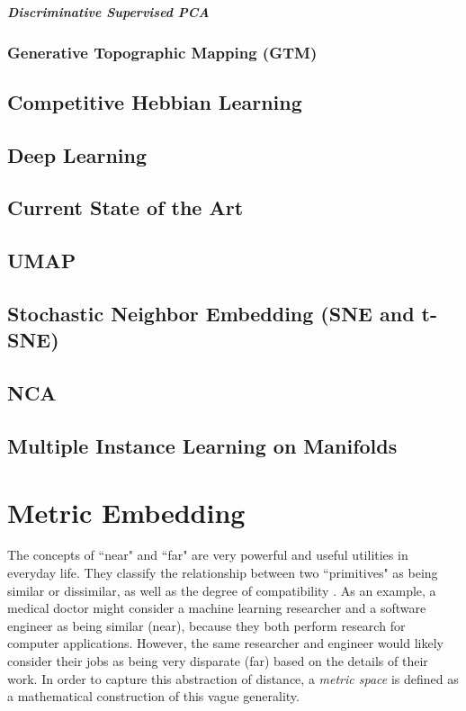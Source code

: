 \subparagraph{Discriminative Supervised PCA} 


\subsubsection{Generative Topographic Mapping (GTM)}

\subsection{Competitive Hebbian Learning}

\subsection{Deep Learning}

\subsection{Current State of the Art}
\subsection{UMAP}

\subsection{Stochastic Neighbor Embedding (SNE and t-SNE)}

\subsection{NCA}

\subsection{Multiple Instance Learning on Manifolds}

\section{Metric Embedding}

The concepts of ``near" and ``far" are very powerful and useful utilities in everyday life.  They classify the relationship between two ``primitives" as being similar or dissimilar, as well as the degree of compatibility \citep{Thorstensen2009ManifoldThesis}. As an example, a medical doctor might consider a machine learning researcher and a software engineer as being similar (near), because they both perform research for computer applications.  However, the same researcher and engineer would likely consider their jobs as being very disparate (far) based on the details of their work.  In order to capture this abstraction of distance, a \textit{metric space} is defined as a mathematical construction  of this vague generality.


